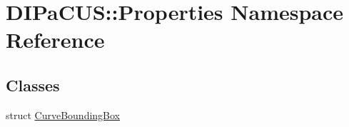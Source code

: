 \hypertarget{namespaceDIPaCUS_1_1Properties}{}\section{D\+I\+Pa\+C\+US\+:\+:Properties Namespace Reference}
\label{namespaceDIPaCUS_1_1Properties}
\subsection*{Classes}
\begin{DoxyCompactItemize}
\item 
struct \mbox{\hyperlink{structDIPaCUS_1_1Properties_1_1CurveBoundingBox}{Curve\+Bounding\+Box}}
\end{DoxyCompactItemize}
